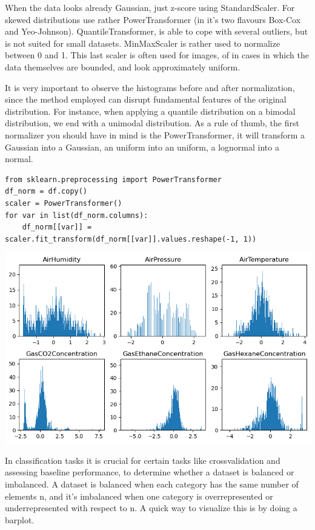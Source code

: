 \documentclass[24pt]{article}
\begin{document}
When the data looks already Gaussian, just z-score using StandardScaler. For skewed distributions use rather PowerTransformer (in it's two flavours  Box-Cox and Yeo-Johnson). QuantileTransformer,  is able to cope with several outliers, but is not suited for small datasets. MinMaxScaler is rather used to normalize between 0 and 1. This last scaler is often used for images, of in cases in which the data themselves are bounded, and look approximately uniform.

It is very important to observe the histograms before and after normalization, since the method employed can disrupt fundamental features of the original distribution. For instance, when applying a quantile distribution on a bimodal distribution, we end with a unimodal distribution. 
 As a rule of thumb, the first normalizer you should have in mind is the PowerTransformer, it will transform a Gaussian into a Gaussian, an uniform into an uniform, a lognormal into a normal.





\begin{lstlisting}
from sklearn.preprocessing import PowerTransformer
df_norm = df.copy()
scaler = PowerTransformer()
for var in list(df_norm.columns):
    df_norm[[var]] = scaler.fit_transform(df_norm[[var]].values.reshape(-1, 1))
\end{lstlisting}


\begin{center}
\includegraphics[scale = 0.6]{histograms_output.png}
\end{center}

In classification tasks it is crucial for certain tasks like crossvalidation and assessing baseline performance, to determine whether a dataset is balanced or imbalanced. A dataset is balanced when each category has the same number of elements n, and it's imbalanced when one category is overrepresented or underrepresented with respect to n.
A quick way to visualize this is by doing a barplot.
\end{document}
